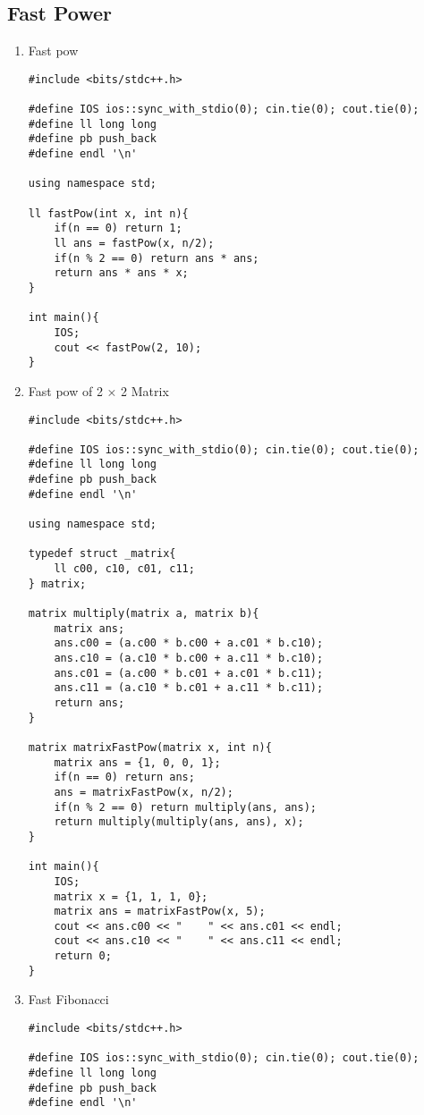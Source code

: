 \documentclass[12pt, a4paper]{article}
\begin{document}
\subsection{Fast Power}
\begin{enumerate}
\item {Fast pow}
\begin{lstlisting}
#include <bits/stdc++.h>

#define IOS ios::sync_with_stdio(0); cin.tie(0); cout.tie(0);
#define ll long long
#define pb push_back
#define endl '\n'

using namespace std;

ll fastPow(int x, int n){
    if(n == 0) return 1;
    ll ans = fastPow(x, n/2);
    if(n % 2 == 0) return ans * ans;
    return ans * ans * x;
}

int main(){
    IOS;
    cout << fastPow(2, 10);
}
\end{lstlisting}
\item {Fast pow of 2 × 2 Matrix}
\begin{lstlisting}
#include <bits/stdc++.h>

#define IOS ios::sync_with_stdio(0); cin.tie(0); cout.tie(0);
#define ll long long
#define pb push_back
#define endl '\n'

using namespace std;

typedef struct _matrix{
    ll c00, c10, c01, c11;   
} matrix;

matrix multiply(matrix a, matrix b){
    matrix ans;
    ans.c00 = (a.c00 * b.c00 + a.c01 * b.c10);
    ans.c10 = (a.c10 * b.c00 + a.c11 * b.c10);
    ans.c01 = (a.c00 * b.c01 + a.c01 * b.c11);
    ans.c11 = (a.c10 * b.c01 + a.c11 * b.c11);
    return ans;
}

matrix matrixFastPow(matrix x, int n){
    matrix ans = {1, 0, 0, 1};
    if(n == 0) return ans;
    ans = matrixFastPow(x, n/2);
    if(n % 2 == 0) return multiply(ans, ans);
    return multiply(multiply(ans, ans), x);
}

int main(){
    IOS;
    matrix x = {1, 1, 1, 0};
    matrix ans = matrixFastPow(x, 5);
    cout << ans.c00 << "    " << ans.c01 << endl;
    cout << ans.c10 << "    " << ans.c11 << endl;
    return 0;
}
\end{lstlisting}
\item {Fast Fibonacci}
\begin{lstlisting}
#include <bits/stdc++.h>

#define IOS ios::sync_with_stdio(0); cin.tie(0); cout.tie(0);
#define ll long long
#define pb push_back
#define endl '\n'


\end{lstlisting}
\end{enumerate}
\end{document}
